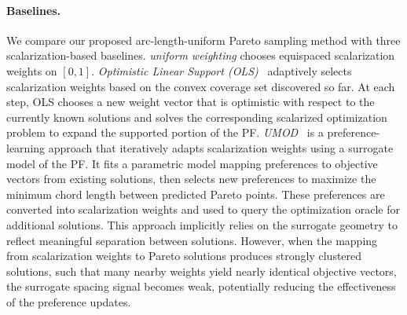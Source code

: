 \documentclass{article}
\begin{document}
\paragraph{Baselines.}
We compare our proposed arc-length-uniform Pareto sampling method with three scalarization-based baselines. 
\textit{uniform weighting} chooses equispaced scalarization weights on $[0,1]$.
\textit{Optimistic Linear Support (OLS)}~\citep{barrett2008learning} adaptively selects scalarization weights based on the convex coverage set discovered so far. At each step, OLS chooses a new weight vector that is optimistic with respect to the currently known solutions and solves the corresponding scalarized optimization problem to expand the supported portion of the PF.
\textit{UMOD}~\citep{zhang2024gliding} is a preference-learning approach that iteratively adapts scalarization weights using a surrogate model of the PF. It fits a parametric model mapping preferences to objective vectors from existing solutions, then selects new preferences to maximize the minimum chord length between predicted Pareto points. These preferences are converted into scalarization weights and used to query the optimization oracle for additional solutions. This approach implicitly relies on the surrogate geometry to reflect meaningful separation between solutions. However, when the mapping from scalarization weights to Pareto solutions produces strongly clustered solutions, such that many nearby weights yield nearly identical objective vectors, the surrogate spacing signal becomes weak, potentially reducing the effectiveness of the preference updates.
\end{document}
